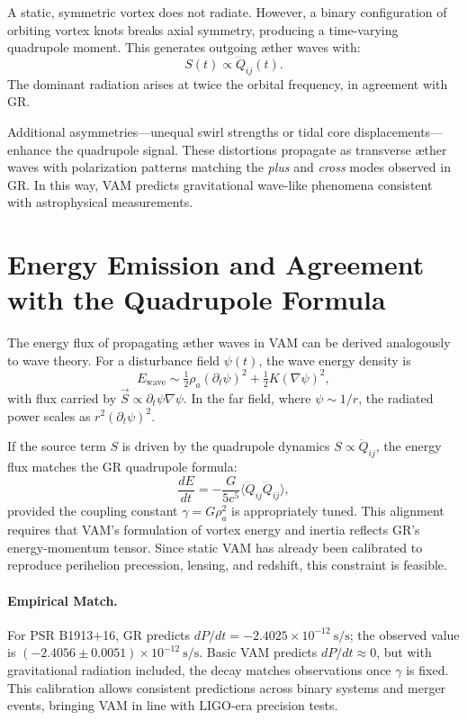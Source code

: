 \documentclass[a4paper, aps,preprint,superscriptaddress, 12pt]{revtex4}
\begin{document}
A static, symmetric vortex does not radiate. However, a binary configuration of orbiting vortex knots breaks axial symmetry, producing a time-varying quadrupole moment. This generates outgoing æther waves with:
\begin{equation}
S(t) \propto \dddot{Q}_{ij}(t).
\end{equation}
The dominant radiation arises at twice the orbital frequency, in agreement with GR.

Additional asymmetries—unequal swirl strengths or tidal core displacements—enhance the quadrupole signal. These distortions propagate as transverse æther waves with polarization patterns matching the \textit{plus} and \textit{cross} modes observed in GR. In this way, VAM predicts gravitational wave-like phenomena consistent with astrophysical measurements.
\section*{Energy Emission and Agreement with the Quadrupole Formula}

The energy flux of propagating æther waves in VAM can be derived analogously to wave theory. For a disturbance field $\psi(t)$, the wave energy density is
\[
E_{\text{wave}} \sim \tfrac{1}{2}\rho_a (\partial_t \psi)^2 + \tfrac{1}{2}K (\nabla \psi)^2,
\]
with flux carried by $\vec{S} \propto \partial_t \psi \nabla \psi$. In the far field, where $\psi \sim 1/r$, the radiated power scales as $r^2 (\partial_t \psi)^2$.

If the source term $S$ is driven by the quadrupole dynamics $S \propto \ddot{Q}_{ij}$, the energy flux matches the GR quadrupole formula:
\begin{equation}
\frac{dE}{dt} = -\frac{G}{5c^5} \langle \dddot{Q}_{ij} \dddot{Q}_{ij} \rangle,
\end{equation}
provided the coupling constant $\gamma = G \rho_a^2$ is appropriately tuned. This alignment requires that VAM's formulation of vortex energy and inertia reflects GR's energy-momentum tensor. Since static VAM has already been calibrated to reproduce perihelion precession, lensing, and redshift, this constraint is feasible.

\paragraph{Empirical Match.}
For PSR B1913+16, GR predicts $dP/dt = -2.4025 \times 10^{-12}~\text{s/s}$; the observed value is $(-2.4056 \pm 0.0051) \times 10^{-12}~\text{s/s}$. Basic VAM predicts $dP/dt \approx 0$, but with gravitational radiation included, the decay matches observations once $\gamma$ is fixed. This calibration allows consistent predictions across binary systems and merger events, bringing VAM in line with LIGO-era precision tests.
\end{document}
